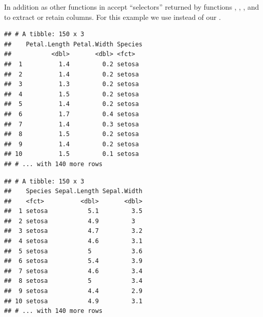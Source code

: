 \documentclass[krantz2]{krantz}\usepackage{knitr}%
\begin{document}
In addition  as other functions in  accept ``selectors'' returned by functions , , , and  to extract or retain columns. For this example we use \Rlang {} instead of our .

\begin{knitrout}\footnotesize
{}\color{fgcolor}\begin{kframe}
\begin{alltt}
 \hlopt{-}\hlstd{(}\hlstd{))}
\end{alltt}
\begin{verbatim}
## # A tibble: 150 x 3
##    Petal.Length Petal.Width Species
##           <dbl>       <dbl> <fct>  
##  1          1.4         0.2 setosa 
##  2          1.4         0.2 setosa 
##  3          1.3         0.2 setosa 
##  4          1.5         0.2 setosa 
##  5          1.4         0.2 setosa 
##  6          1.7         0.4 setosa 
##  7          1.4         0.3 setosa 
##  8          1.5         0.2 setosa 
##  9          1.4         0.2 setosa 
## 10          1.5         0.1 setosa 
## # ... with 140 more rows
\end{verbatim}
\end{kframe}
\end{knitrout}

\begin{knitrout}\footnotesize
{}\color{fgcolor}\begin{kframe}
\begin{alltt}
 \hlstd{(}\hlstd{))}
\end{alltt}
\begin{verbatim}
## # A tibble: 150 x 3
##    Species Sepal.Length Sepal.Width
##    <fct>          <dbl>       <dbl>
##  1 setosa           5.1         3.5
##  2 setosa           4.9         3  
##  3 setosa           4.7         3.2
##  4 setosa           4.6         3.1
##  5 setosa           5           3.6
##  6 setosa           5.4         3.9
##  7 setosa           4.6         3.4
##  8 setosa           5           3.4
##  9 setosa           4.4         2.9
## 10 setosa           4.9         3.1
## # ... with 140 more rows
\end{verbatim}
\end{kframe}
\end{knitrout}
\end{document}
